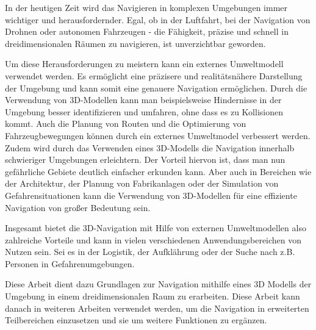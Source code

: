 

In der heutigen Zeit wird das Navigieren in komplexen Umgebungen immer wichtiger und herausfordernder. Egal, ob in der Luftfahrt, bei der Navigation von Drohnen oder autonomen Fahrzeugen - die Fähigkeit, präzise und schnell in dreidimensionalen Räumen zu navigieren, ist unverzichtbar geworden.

Um diese Herausforderungen zu meistern kann ein externes Umweltmodell verwendet werden. Es ermöglicht eine präzisere und realitätsnähere Darstellung der Umgebung und kann somit eine genauere Navigation ermöglichen. Durch die Verwendung von 3D-Modellen kann man beispielsweise Hindernisse in der Umgebung besser identifizieren und umfahren, ohne dass es zu Kollisionen kommt. Auch die Planung von Routen und die Optimierung von Fahrzeugbewegungen können durch ein externes Umweltmodel verbessert werden. Zudem wird durch das Verwenden eines 3D-Modells die Navigation innerhalb schwieriger Umgebungen erleichtern. Der Vorteil hiervon ist, dass man nun gefährliche Gebiete deutlich einfacher erkunden kann. Aber auch in Bereichen wie der Architektur, der Planung von Fabrikanlagen oder der Simulation von Gefahrensituationen kann die Verwendung von 3D-Modellen für eine effiziente Navigation von großer Bedeutung sein.

Insgesamt bietet die 3D-Navigation mit Hilfe von externen Umweltmodellen also zahlreiche Vorteile und kann in vielen verschiedenen Anwendungsbereichen von Nutzen sein. Sei es in der Logistik, der Aufklährung oder der Suche nach z.B. Personen in Gefahrenumgebungen.

Diese Arbeit dient dazu Grundlagen zur Navigation mithilfe eines 3D Modells der Umgebung in einem dreidimensionalen Raum zu erarbeiten. Diese Arbeit kann danach in weiteren Arbeiten verwendet werden, um die Navigation in erweiterten Teilbereichen einzusetzen und sie um weitere Funktionen zu ergänzen.

